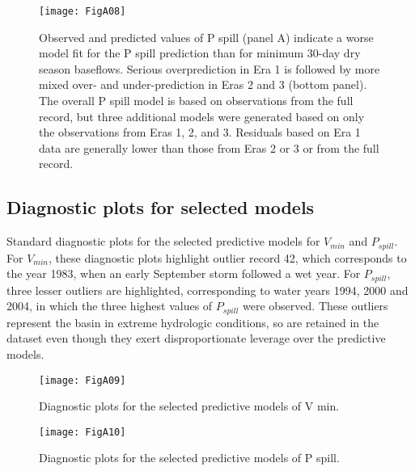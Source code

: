 \documentclass[hess, manuscript]{copernicus}
\begin{document}
\begin{figure}
\texttt{[image: FigA08]} \caption{\label{fig:pspill_pred_over_time} Observed and predicted values of P spill (panel A) indicate a worse model fit for the P spill prediction than for minimum 30-day dry season baseflows. Serious overprediction in Era 1 is followed by more mixed over- and under-prediction in Eras 2 and 3 (bottom panel). The overall P spill model is based on observations from the full record, but three additional models were generated based on only the observations from Eras 1, 2, and 3. Residuals based on Era 1 data are generally lower than those from Eras 2 or 3 or from the full record.}\label{fig:pspill_pred_over_time}
\end{figure}

\newpage

\subsection{Diagnostic plots for selected models}

Standard diagnostic plots for the selected predictive models for
$V_{min}$ and $P_{spill}$. For $V_{min}$, these diagnostic plots
highlight outlier record 42, which corresponds to the year 1983, when an
early September storm followed a wet year. For $P_{spill}$, three
lesser outliers are highlighted, corresponding to water years 1994, 2000
and 2004, in which the three highest values of $P_{spill}$ were
observed. These outliers represent the basin in extreme hydrologic
conditions, so are retained in the dataset even though they exert
disproportionate leverage over the predictive models.

\begin{figure}
\texttt{[image: FigA09]} \caption{\label{fig:vmin_selected_diagnostics} Diagnostic plots for the selected predictive models of V min.}\label{fig:selected_model_diagnostics_vmin}
\end{figure}

\begin{figure}
\texttt{[image: FigA10]} \caption{\label{fig:vmin_selected_diagnostics} Diagnostic plots for the selected predictive models of P spill.}\label{fig:selected_model_diagnostics_pspsill}
\end{figure}

\newpage



\end{document}
